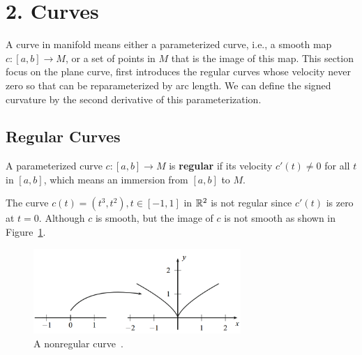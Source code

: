 
\section[Lecture 2--{Curves}]{2. Curves}
A curve in manifold means either a parameterized curve, i.e., a smooth map $c: [a,b]\rightarrow M$, 
or a set of points in $M$ that is the image of this map.
This section focus on the plane curve, first introduces the regular curves whose velocity never zero
so that can be reparameterized
by arc length. We can define the signed curvature by the second derivative of 
this parameterization.
\subsection{Regular Curves}
\begin{definition}
    A parameterized curve $c: [a, b] \rightarrow M$ is \textbf{regular}
     if its velocity $c'(t)\neq 0$ for all $t$ in $[a, b]$, which means an immersion from
     $[a, b]$ to $M$.
\end{definition}
\begin{example}
    The curve $c(t)=(t^3, t^2), t\in [-1, 1]$ in ${\mathbb{R}}^2$ is not regular since $c'(t)$ is zero
    at $t=0$. 
    Although $c$ is smooth, but the image of $c$ is not smooth as shown 
    in Figure~\ref{fig. t3t2 image}.
\end{example}
\begin{figure}[htb]
    \centering
    \includegraphics[width=0.7\textwidth]{../Lectures/Figures/curv_image.png}
    \caption{A nonregular curve~\cite[p.~9]{tu2010introduction}.}
    \label{fig. t3t2 image}
\end{figure}

